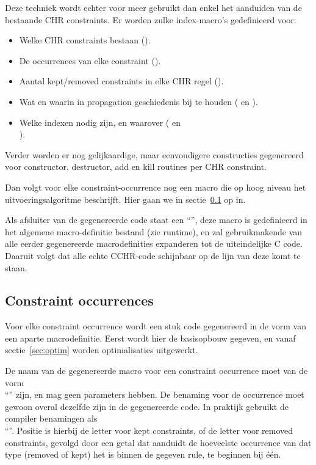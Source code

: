 Deze techniek wordt echter voor meer gebruikt dan enkel het aanduiden van de bestaande CHR constraints. Er worden zulke index-macro's gedefinieerd voor: \begin{itemize}
\item Welke CHR constraints bestaan ().
\item De occurrences van elke constraint ().
\item Aantal kept/removed constraints in elke CHR regel ().
\item Wat en waarin in propagation geschiedenis bij te houden ( en ).
\item Welke indexen nodig zijn, en waarover ( en \\ ).
\end{itemize}
Verder worden er nog gelijkaardige, maar eenvoudigere constructies gegenereerd voor constructor, destructor, add en kill routines per CHR constraint.

Dan volgt voor elke constraint-occurrence nog een macro die op hoog niveau het uitvoeringsalgoritme beschrijft. Hier gaan we in sectie~\ref{gencode-conocc} op in.

Als afsluiter van de gegenereerde code staat een ``'', deze macro is gedefinieerd in het algemene macro-definitie bestand (zie runtime), en zal gebruikmakende van alle eerder gegenereerde macrodefinities expanderen tot de uiteindelijke C code. Daaruit volgt dat alle echte CCHR-code schijnbaar op de lijn van deze  komt te staan.

\subsection{Constraint occurrences} \label{gencode-conocc}

Voor elke constraint occurrence wordt een stuk code gegenereerd in de vorm van een aparte macrodefinitie. Eerst wordt hier de basisopbouw gegeven, en vanaf sectie~\ref{sec:optim} worden optimalisaties uitgewerkt.

De naam van de gegenereerde macro voor een constraint occurrence moet van de vorm \\ ``'' zijn, en mag geen parameters hebben. De benaming voor de occurrence moet gewoon overal dezelfde zijn in de gegenereerde code. In praktijk gebruikt de compiler benamingen als \\ ``''. Positie is hierbij de letter  voor kept constraints, of de letter  voor removed constraints, gevolgd door een getal dat aanduidt de hoeveelste occurrence van dat type (removed of kept) het is binnen de gegeven rule, te beginnen bij \'e\'en.

